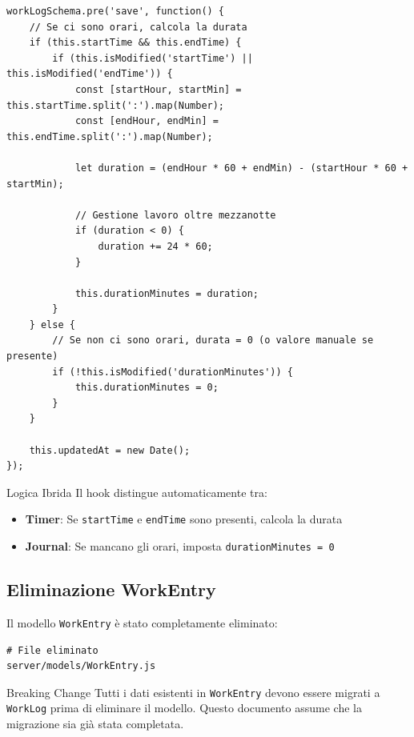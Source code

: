 \documentclass[11pt,a4paper]{article}
\begin{document}
\begin{lstlisting}[caption=Pre-save Hook Ibrido]
workLogSchema.pre('save', function() {
    // Se ci sono orari, calcola la durata
    if (this.startTime && this.endTime) {
        if (this.isModified('startTime') || this.isModified('endTime')) {
            const [startHour, startMin] = this.startTime.split(':').map(Number);
            const [endHour, endMin] = this.endTime.split(':').map(Number);
            
            let duration = (endHour * 60 + endMin) - (startHour * 60 + startMin);
            
            // Gestione lavoro oltre mezzanotte
            if (duration < 0) {
                duration += 24 * 60;
            }
            
            this.durationMinutes = duration;
        }
    } else {
        // Se non ci sono orari, durata = 0 (o valore manuale se presente)
        if (!this.isModified('durationMinutes')) {
            this.durationMinutes = 0;
        }
    }
    
    this.updatedAt = new Date();
});
\end{lstlisting}

\begin{tipbox}{Logica Ibrida}
Il hook distingue automaticamente tra:
\begin{itemize}
    \item \textbf{Timer}: Se \texttt{startTime} e \texttt{endTime} sono presenti, calcola la durata
    \item \textbf{Journal}: Se mancano gli orari, imposta \texttt{durationMinutes = 0}
\end{itemize}
\end{tipbox}

\subsection{Eliminazione WorkEntry}

Il modello \texttt{WorkEntry} è stato completamente eliminato:

\begin{lstlisting}[caption=Eliminazione File]
# File eliminato
server/models/WorkEntry.js
\end{lstlisting}

\begin{warningbox}{Breaking Change}
Tutti i dati esistenti in \texttt{WorkEntry} devono essere migrati a \texttt{WorkLog} prima di eliminare il modello. Questo documento assume che la migrazione sia già stata completata.
\end{warningbox}
\end{document}
